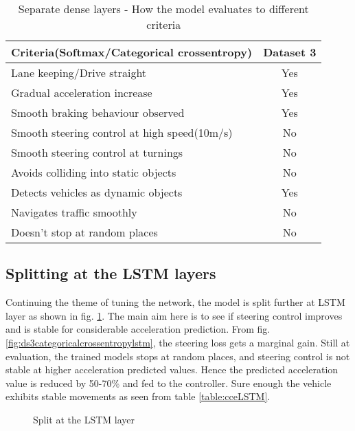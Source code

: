 \begin{table}[h]
    \centering
\begin{tabular}{lc}
    \toprule
    Criteria(Softmax/Categorical crossentropy)  & Dataset 3 \\\midrule
    Lane keeping/Drive straight  & Yes  \\
    Gradual acceleration increase  & Yes\\
    Smooth braking behaviour observed & Yes \\
    Smooth steering control at high speed(10m/s) & No \\
    Smooth steering control at turnings & No\\
    Avoids colliding into static objects & No \\
    Detects vehicles as dynamic objects & Yes \\
    Navigates traffic smoothly & No\\
    Doesn't stop at random places & No \\\bottomrule
\end{tabular}
\caption{Separate dense layers - How the model evaluates to different criteria}
\label{table:ccedense}
\end{table}
\newpage
\subsection{Splitting at the LSTM layers}
Continuing the theme of tuning the network, the model is split further at LSTM layer as shown in fig. \ref{fig:steeringlstmsplit}. The main aim here is to see if steering control improves and
is stable for considerable acceleration prediction. From fig. \ref{fig:ds3categoricalcrossentropylstm}, the steering loss gets a marginal gain. Still at
evaluation, the trained models stops at random places, and steering control is not stable at
higher acceleration predicted values. Hence the predicted acceleration value is reduced by
50-70\% and fed to the controller. Sure enough the vehicle exhibits stable movements as
seen from table \ref{table:cceLSTM}.

\begin{figure}[!ht]
	\centering
    \def\svgwidth{0.25\textwidth}
    \caption{Split at the LSTM layer}
    \label{fig:steeringlstmsplit}
\end{figure}

